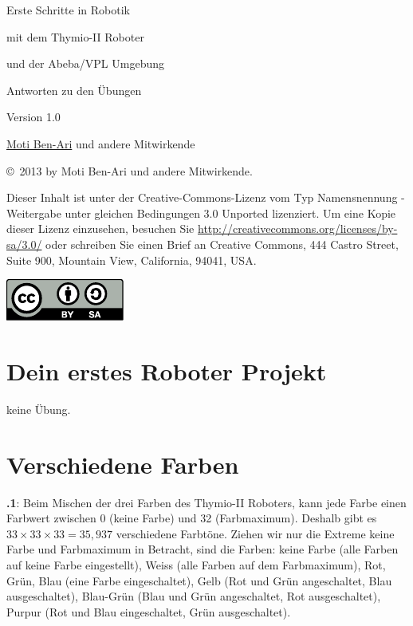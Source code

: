 \documentclass[12pt,a4paper]{article}
\begin{document}
\thispagestyle{empty}

\begin{center}
\begin{bfseries}

\begin{Large}
Erste Schritte in Robotik

mit dem Thymio-II Roboter

und der Abeba/VPL Umgebung

\bigskip

Antworten zu den Übungen

\end{Large}

Version 1.0

\bigskip

\href{http://www.weizmann.ac.il/sci-tea/benari/}{Moti Ben-Ari} und andere Mitwirkende

\end{bfseries}
\end{center}

\bigskip

\copyright{}\  2013 by Moti Ben-Ari und andere Mitwirkende. 

Dieser Inhalt ist unter der Creative-Commons-Lizenz vom Typ Namensnennung -
Weitergabe unter gleichen Bedingungen 3.0 Unported lizenziert.
Um eine Kopie dieser Lizenz einzusehen, besuchen Sie \url{http://creativecommons.org/licenses/by-sa/3.0/} oder schreiben Sie einen Brief an Creative Commons, 444 Castro Street, Suite 900, Mountain View, California, 94041, USA.

\begin{center}
\hspace{6pt}\includegraphics[width=.2\textwidth]{../images/by-sa}
\end{center}


\section{Dein erstes Roboter Projekt}

keine Übung.

\section{Verschiedene Farben}

\textbf{\thesection.1}: 
Beim Mischen der drei Farben des Thymio-II Roboters, kann jede Farbe einen Farbwert zwischen 0 (keine Farbe) und 32 (Farbmaximum). Deshalb gibt es $33  \times 33  \times 33=35,937$ verschiedene Farbtöne. Ziehen wir nur die Extreme keine Farbe und Farbmaximum in Betracht, sind die Farben: keine Farbe (alle Farben auf keine Farbe eingestellt), Weiss (alle Farben auf dem Farbmaximum), Rot, Grün, Blau (eine Farbe eingeschaltet), Gelb (Rot und Grün angeschaltet, Blau ausgeschaltet), Blau-Grün (Blau und Grün angeschaltet, Rot ausgeschaltet), Purpur (Rot und Blau eingeschaltet, Grün ausgeschaltet).
\end{document}
